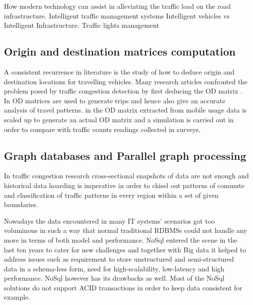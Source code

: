 \documentclass[12pt, a4paper]{report}
\theoremstyle{definition}
\theoremstyle{definition}%
\theoremstyle{definition}%
\theoremstyle{definition}%
\theoremstyle{definition}%
\theoremstyle{definition}%
\begin{document}
How modern technology can assist in alleviating the traffic load on the road infrastructure.
Intelligent traffic management systems
Intelligent vehicles vs Intelligent Infrastructure. \cite{Nkoro2014}
Traffic lights management \cite{AlNuaimi2015} \cite{Marino2017}



\subsection{Origin and destination matrices computation} \label{OD_Matrices}
A consistent recurrence in literature is the study of how to deduce origin and destination locations for travelling vehicles\cite{Iqbal2014}. Many research articles confronted the problem posed by traffic congestion detection by first deducing the OD matrix \cite{Toole2015,Iqbal2014,Alexander2015}. In \cite{Alexander2015} OD matrices are used to generate trips and hence also give an accurate analysis of travel patterns. in \cite{Iqbal2014} the OD matrix extracted from mobile usage data is scaled up to generate an actual OD matrix and a simulation is carried out in order to compare with traffic counts readings collected in surveys.

\subsection{Graph databases and Parallel graph processing}
In traffic congestion research cross-sectional snapshots of data are not enough and historical data hoarding is imperative in order to chisel out patterns of commute and classification of traffic patterns in every region within a set of given boundaries.

Nowadays the data encountered in many IT systems' scenarios got too voluminous in such a way that normal traditional RDBMSs could not handle any more in terms of both model and performance.  NoSql entered the scene in the last ten years to cater for new challenges and together with Big data it helped to address issues such as requirement to store unstructured and semi-structured data in a schema-less form, need for high-scalability, low-latency and high performance. NoSql however has its drawbacks as well. Most of the NoSql solutions do not support ACID transactions in order to keep data consistent for example.  
\end{document}
